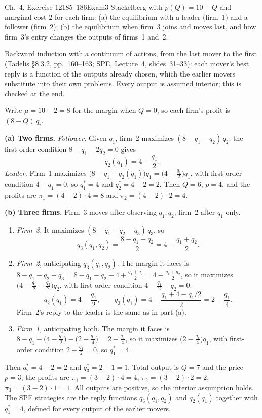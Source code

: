 \begin{exsol}{\MG{} Ch.~4, Exercise 12}{185--186}{Exam}{3}
\asked Stackelberg with $p(Q) = 10 - Q$ and marginal cost $2$ for each firm: (a) the equilibrium with a leader
(firm~1) and a follower (firm~2); (b) the equilibrium when firm~3 joins and moves last, and how firm~3's entry
changes the outputs of firms~1 and~2.

\method Backward induction with a continuum of actions, from the last mover to the first (Tadelis \S8.3.2,
pp.~160--163; SPE, Lecture~4, slides~31--33): each mover's best reply is a function of the outputs already chosen,
which the earlier movers substitute into their own problems. Every output is assumed interior; this is checked at the end.

\solution
Write $\mu = 10 - 2 = 8$ for the margin when $Q = 0$, so each firm's profit is $(8 - Q)\,q_i$.

\textbf{(a) Two firms.} \emph{Follower.} Given $q_1$, firm~2 maximizes $(8 - q_1 - q_2)\,q_2$; the first-order
condition $8 - q_1 - 2q_2 = 0$ gives
\[
  q_2(q_1) = 4 - \frac{q_1}{2}.
\]
\emph{Leader.} Firm~1 maximizes $\bigl(8 - q_1 - q_2(q_1)\bigr)q_1 = \bigl(4 - \frac{q_1}{2}\bigr)q_1$, with
first-order condition $4 - q_1 = 0$, so $q_1^* = 4$ and $q_2^* = 4 - 2 = 2$. Then $Q = 6$, $p = 4$, and the profits are
$\pi_1 = (4-2)\cdot 4 = 8$ and $\pi_2 = (4-2)\cdot 2 = 4$.

\textbf{(b) Three firms.} Firm~3 moves after observing $q_1, q_2$; firm~2 after $q_1$ only.
\begin{enumerate}[label=\arabic*.]
  \item \emph{Firm~3.} It maximizes $(8 - q_1 - q_2 - q_3)\,q_3$, so
  \[
    q_3(q_1, q_2) = \frac{8 - q_1 - q_2}{2} = 4 - \frac{q_1 + q_2}{2}.
  \]
  \item \emph{Firm~2,} anticipating $q_3(q_1, q_2)$. The margin it faces is
  $8 - q_1 - q_2 - q_3 = 8 - q_1 - q_2 - 4 + \frac{q_1+q_2}{2} = 4 - \frac{q_1 + q_2}{2}$, so it maximizes
  $\bigl(4 - \frac{q_1}{2} - \frac{q_2}{2}\bigr)q_2$, with first-order condition $4 - \frac{q_1}{2} - q_2 = 0$:
  \[
    q_2(q_1) = 4 - \frac{q_1}{2}, \qquad q_3(q_1) = 4 - \frac{q_1 + 4 - q_1/2}{2} = 2 - \frac{q_1}{4}.
  \]
  Firm~2's reply to the leader is the same as in part (a).
  \item \emph{Firm~1,} anticipating both. The margin it faces is
  $8 - q_1 - \bigl(4 - \frac{q_1}{2}\bigr) - \bigl(2 - \frac{q_1}{4}\bigr) = 2 - \frac{q_1}{4}$, so it maximizes
  $\bigl(2 - \frac{q_1}{4}\bigr)q_1$, with first-order condition $2 - \frac{q_1}{2} = 0$, so $q_1^* = 4$.
\end{enumerate}
Then $q_2^* = 4 - 2 = 2$ and $q_3^* = 2 - 1 = 1$. Total output is $Q = 7$ and the price $p = 3$; the profits are
$\pi_1 = (3 - 2)\cdot 4 = 4$, $\pi_2 = (3-2)\cdot 2 = 2$, $\pi_3 = (3-2)\cdot 1 = 1$. All outputs are positive, so
the interior assumption holds. The SPE strategies are the reply functions $q_3(q_1, q_2)$ and $q_2(q_1)$ together with
$q_1^* = 4$, defined for every output of the earlier movers.


\end{exsol}

